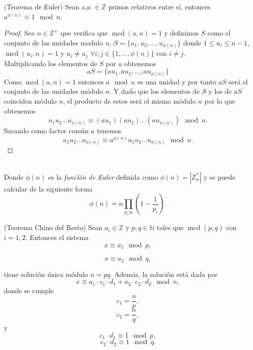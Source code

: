 \begin{teorema}
	(Teorema de Euler) Sean a,n $\in \mathbb{Z}$ primos relativos entre sí, entonces $a^{\phi(n)}\equiv 1 \mod n$.
\end{teorema}\vspace*{-10mm}
\begin{proof}
		Sea $n\in \mathbb{Z^+}$ que verifica que $\operatorname{mcd}(a,n)=1$ y definimos $S$ como el conjunto de las unidades modulo $n$, $S=\{u_1,u_2,\dots,u_{\phi(n)}\}$ donde $1\leq u_i\leq n-1$, $\operatorname{mcd}(u_i,n)=1$ y $u_i\neq u_j$ $\forall i,j \in \{1,\dots,\phi(n)\}$ con $ i\neq j$.\\
	Multiplicando  los elementos de $S$ por $a$ obtenemos 
	$$
		aS=\{au_1,au_2,\dots,au_{\phi(n)}\}
	$$
	Como $\operatorname{mcd}(a,n)=1$ entonces $a\mod n$ es una unidad y por tanto $aS$ será el conjunto de las unidades módulo $n$. Y dado que los elementos de $S$ y los de $aS$ coinciden módulo $n$, el producto de estos será el mismo módulo $n$ por lo que obtenemos 
	$$
		u_1u_2\dots u_{\phi(n)} \equiv (au_1)(au_2)\dots (au_{\phi(n)})\mod n.
	$$
	Sacando como factor común $a$ tenemos 
	$$
		u_1u_2\dots u_{\phi(n)} \equiv a^{\phi(n)}u_1u_2\dots u_{\phi(n)}\mod n.
	$$
\end{proof}\\
Donde $\phi(n)$ es la \emph{funclón de Euler} definida como $\phi(n)=|\mathbb{Z}^*_n|$ y se puede calcular de la siguiente forma $$\phi(n)=n\prod_{p_i|n}\left(1-\frac{1}{p_i}\right).$$

\begin{teorema}
		(Teorema Chino del Resto) Sean $a_i\in \mathbb{Z}$ y $p,q \in \mathbb{N}$ tales que $\operatorname{mcd}(p,q)$ con $i = 1,2$. Entonces el sistema
		$$
			x\equiv a_1 \mod p,
		$$\vspace*{-10mm}

		$$
			x\equiv a_2 \mod q,
		$$

	tiene solución única módulo $n=pq$. Además, la solución está dada por
	$$
		x\equiv a_1\cdot c_1\cdot d_1 +a_2\cdot c_2\cdot d_2 \mod n,
	$$
	donde se cumple
	$$
		c_1=\frac{n}{p},
	$$
	$$
		c_2=\frac{n}{q},
	$$
		y
	$$
		c_1\cdot d_1 \equiv 1 \mod p,
	$$
	$$
		c_2\cdot d_2 \equiv 1 \mod q.
	$$
	
\end{teorema}

